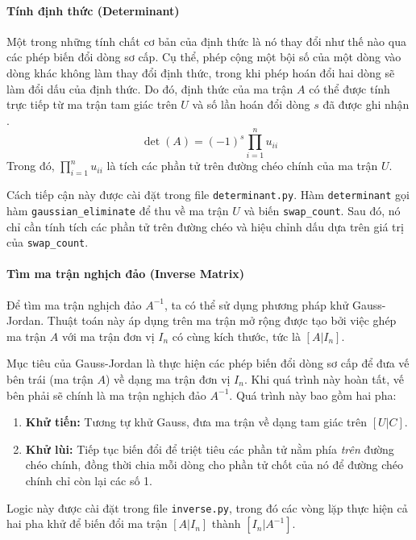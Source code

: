\paragraph{Tính định thức (Determinant)}
Một trong những tính chất cơ bản của định thức là nó thay đổi như thế nào qua các phép biến đổi dòng sơ cấp. Cụ thể, phép cộng một bội số của một dòng vào dòng khác không làm thay đổi định thức, trong khi phép hoán đổi hai dòng sẽ làm đổi dấu của định thức. Do đó, định thức của ma trận $A$ có thể được tính trực tiếp từ ma trận tam giác trên $U$ và số lần hoán đổi dòng $s$ đã được ghi nhận \cite{strang}.
\begin{equation}
    \det(A) = (-1)^s \prod_{i=1}^{n} u_{ii}
    \label{eq:determinant}
\end{equation}
Trong đó, $\prod_{i=1}^{n} u_{ii}$ là tích các phần tử trên đường chéo chính của ma trận $U$.

Cách tiếp cận này được cài đặt trong file \texttt{determinant.py}. Hàm \texttt{determinant} gọi hàm \texttt{gaussian\_eliminate} để thu về ma trận $U$ và biến \texttt{swap\_count}. Sau đó, nó chỉ cần tính tích các phần tử trên đường chéo và hiệu chỉnh dấu dựa trên giá trị của \texttt{swap\_count}.

\paragraph{Tìm ma trận nghịch đảo (Inverse Matrix)}
Để tìm ma trận nghịch đảo $A^{-1}$, ta có thể sử dụng phương pháp khử Gauss-Jordan. Thuật toán này áp dụng trên ma trận mở rộng được tạo bởi việc ghép ma trận $A$ với ma trận đơn vị $I_n$ có cùng kích thước, tức là $[A | I_n]$.

Mục tiêu của Gauss-Jordan là thực hiện các phép biến đổi dòng sơ cấp để đưa vế bên trái (ma trận $A$) về dạng ma trận đơn vị $I_n$. Khi quá trình này hoàn tất, vế bên phải sẽ chính là ma trận nghịch đảo $A^{-1}$. Quá trình này bao gồm hai pha:
\begin{enumerate}
    \item \textbf{Khử tiến:} Tương tự khử Gauss, đưa ma trận về dạng tam giác trên $[U | C]$.
    \item \textbf{Khử lùi:} Tiếp tục biến đổi để triệt tiêu các phần tử nằm phía \textit{trên} đường chéo chính, đồng thời chia mỗi dòng cho phần tử chốt của nó để đường chéo chính chỉ còn lại các số 1.
\end{enumerate}
Logic này được cài đặt trong file \texttt{inverse.py}, trong đó các vòng lặp thực hiện cả hai pha khử để biến đổi ma trận $[A | I_n]$ thành $[I_n | A^{-1}]$.

